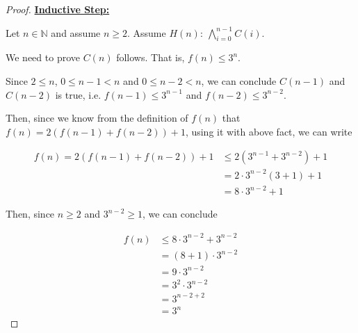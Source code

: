 \documentclass[12pt]{article}
\begin{document}
\begin{itemize}
\begin{proof}
    \underline{\textbf{Inductive Step:}}

    \bigskip

    Let $n \in \mathbb{N}$ and assume $n \geq 2$. Assume $H(n):\:\bigwedge\limits_{i=0}^{n-1} C(i)$.

    \bigskip

    We need to prove $C(n)$ follows. That is, $f(n) \leq 3^n$.

    \bigskip

    Since $2 \leq n$, $0 \leq n - 1 < n$ and $0 \leq n - 2 < n$, we can
    conclude $C(n-1)$ and $C(n-2)$ is true, i.e. $f(n-1) \leq 3^{n-1}$ and
    $f(n-2) \leq 3^{n-2}$.

    \bigskip

    Then, since we know from the definition of $f(n)$ that $f(n) = 2(f(n-1) + f(n-2)) + 1$,
    using it with above fact, we can write

    \bigskip

    \begin{align}
        f(n) = 2(f(n-1) + f(n-2)) + 1 &\leq 2(3^{n-1} + 3^{n-2}) + 1\\
        &= 2 \cdot 3^{n-2} (3+1) + 1\\
        &= 8 \cdot 3^{n-2} + 1
    \end{align}

    \bigskip

    Then, since $n \geq 2$ and $3^{n-2} \geq 1$, we can conclude

    \begin{align}
        f(n) &\leq 8 \cdot 3^{n-2} + 3^{n-2}\\
        &= (8+1) \cdot 3^{n-2}\\
        &= 9 \cdot 3^{n-2}\\
        &= 3^2 \cdot 3^{n-2}\\
        &= 3^{n-2+2}\\
        &= 3^n
    \end{align}

    \end{proof}








\end{itemize}
\end{document}
